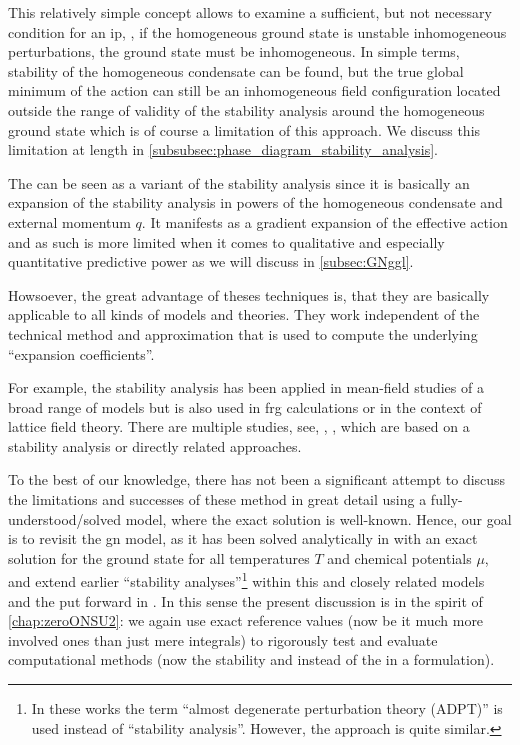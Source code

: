 This relatively simple concept allows to examine a sufficient, but not necessary condition for an \gls{ip}, \ie{}, if the homogeneous ground state is unstable \wrt{} inhomogeneous perturbations, the ground state must be inhomogeneous.
In simple terms, stability of the homogeneous condensate can be found, but the true global minimum of the action can still be an inhomogeneous field configuration located outside the range of validity of the stability analysis around the homogeneous ground state \dash{} which is of course a limitation of this approach.
We discuss this limitation at length in \cref{subsubsec:phase_diagram_stability_analysis}.

The \ggla{} can be seen as a variant of the stability analysis since it is basically an expansion of the stability analysis in powers of the homogeneous condensate and external momentum $q$.
It manifests as a gradient expansion of the effective action and as such is more limited when it comes to qualitative and especially quantitative predictive power as we will discuss in \cref{subsec:GNggl}.\bigskip

Howsoever, the great advantage of theses techniques is, that they are basically applicable to all kinds of models and theories.
They work independent of the technical method and approximation that is used to compute the underlying ``expansion coefficients''.

For example, the stability analysis has been applied in mean-field studies of a broad range of models but is also used in \gls{frg} calculations or in the context of lattice field theory.
There are multiple studies, see, \eg{}, , which are based on a stability analysis or directly related approaches.
	
To the best of our knowledge, there has not been a significant attempt to discuss the limitations and successes of these method in great detail using a fully-understood/solved model, where the exact solution is well-known.
Hence, our goal is to revisit the \twoDimensional{} \gls{gn} model, as it has been solved analytically in  with an exact solution for the ground state for all temperatures $T$ and chemical potentials $\mu$, and extend earlier ``stability analyses''\footnote{In these works the term ``almost degenerate perturbation theory (ADPT)'' is used instead of ``stability analysis''. However, the approach is quite similar.} within this and closely related models~\cite{Thies:2003kk,Boehmer:2008uq,Boehmer:2007ea,Thies:2019ejd} and the \ggla{} put forward in .
In this sense the present discussion is in the spirit of \cref{chap:zeroONSU2}: we again use exact reference values (now be it much more involved ones than just mere integrals) to rigorously test and evaluate computational methods (now the stability and \ggla{} instead of the \frg{} in a \cfd{} formulation).
	
